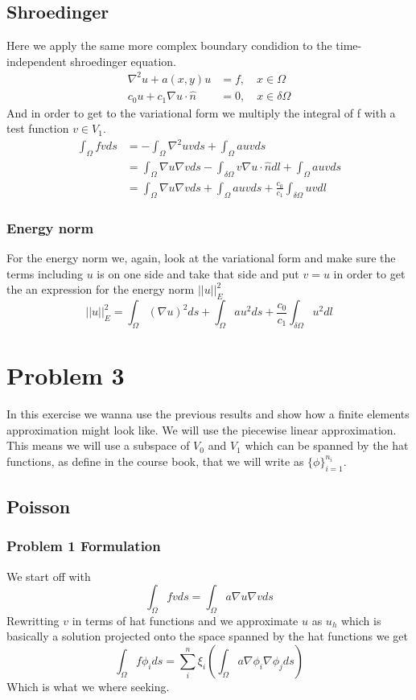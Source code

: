 \documentclass[11pt]{article}
\begin{document}
\subsection{Shroedinger}
Here we apply the same more complex boundary condidion to the time-independent shroedinger equation. 
\begin{align}
	\nabla^2 u + a(x,y) u &= f, \quad x\in \Omega \\
	c_0 u + c_1 \nabla u \cdot \hat{n} &= 0, \quad x \in \delta \Omega
\end{align}
And in order to get to the variational form we multiply the integral of f with a test function $v\in V_1$. 
\begin{align}
	\int_{\Omega} f v d s &= - \int_{\Omega} \nabla^2 u v ds + \int_{\Omega} auv ds \\
	&= \int_{\Omega} \nabla u\nabla vds-\int_{\delta\Omega} v \nabla u \cdot \hat{n}dl + \int_{\Omega} auvds \\
	&= \int_{\Omega} \nabla u \nabla v ds + \int_{\Omega} a u v ds + \frac{c_0}{c_1}\int_{\delta \Omega} u v dl 
\end{align}
\subsubsection{Energy norm}
For the energy norm we, again, look at the variational form and make sure the terms including $u$ is on one side and take that side and put $v=u$ in order to get the an expression for the energy norm $||u||^2_E$
\begin{equation}
	||u||^2_E = \int_{\Omega} (\nabla u)^2 ds + \int_{\Omega} a u^2 ds + \frac{c_0}{c_1}\int_{\delta \Omega} u^2 dl 
\end{equation}

\section{Problem 3}
In this exercise we wanna use the previous results and show how a finite elements approximation might look like. We will use the piecewise linear approximation. This means we will use a subspace of $V_0$ and $V_1$ which can be spanned by the hat functions, as define in the course book, that we will write as $\{\phi\}^{n_i}_{i=1}$.
\subsection{Poisson}
\subsubsection{Problem 1 Formulation}
We start off with
\begin{equation}
	\int_{\Omega} f v d s = \int_{\Omega} a \nabla u \nabla v ds
\end{equation}
Rewritting $v$ in terms of hat functions and we approximate $u$ as $u_h$ which is basically a solution projected onto the space spanned by the hat functions we get
\begin{equation}
	\int_{\Omega} f \phi_i ds = \sum^n_i \xi_i (\int_{\Omega} a \nabla \phi_i \nabla \phi_j ds)
\end{equation}
Which is what we where seeking.
\end{document}
